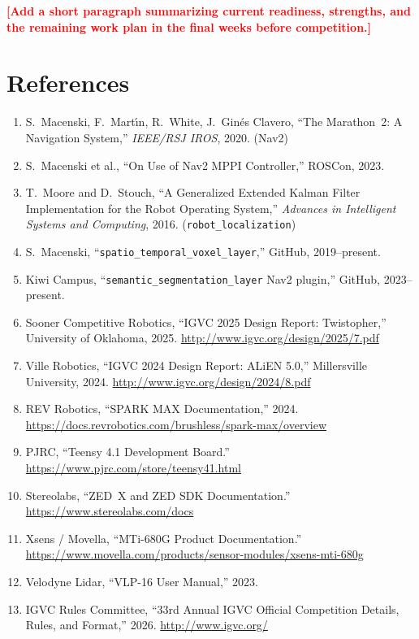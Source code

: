 \documentclass[11pt, letterpaper]{article}
\newcommand{\placeholder}[1]{\textcolor{red}{\textbf{[#1]}}}
\begin{document}
\placeholder{Add a short paragraph summarizing current readiness, strengths, and the
remaining work plan in the final weeks before competition.}

\section*{References}

\begin{enumerate}[leftmargin=*]
    \item S.~Macenski, F.~Mart{\'\i}n, R.~White, J.~Gin{\'e}s Clavero, ``The Marathon~2: A Navigation System,'' \textit{IEEE/RSJ IROS}, 2020. (Nav2)
    \item S.~Macenski et al., ``On Use of Nav2 MPPI Controller,'' ROSCon, 2023.
    \item T.~Moore and D.~Stouch, ``A Generalized Extended Kalman Filter Implementation for the Robot Operating System,'' \textit{Advances in Intelligent Systems and Computing}, 2016. (\texttt{robot\_localization})
    \item S.~Macenski, ``\texttt{spatio\_temporal\_voxel\_layer},'' GitHub, 2019--present.
    \item Kiwi Campus, ``\texttt{semantic\_segmentation\_layer} Nav2 plugin,'' GitHub, 2023--present.
    \item Sooner Competitive Robotics, ``IGVC 2025 Design Report: Twistopher,'' University of Oklahoma, 2025. \url{http://www.igvc.org/design/2025/7.pdf}
    \item Ville Robotics, ``IGVC 2024 Design Report: ALiEN 5.0,'' Millersville University, 2024. \url{http://www.igvc.org/design/2024/8.pdf}
    \item REV Robotics, ``SPARK MAX Documentation,'' 2024. \url{https://docs.revrobotics.com/brushless/spark-max/overview}
    \item PJRC, ``Teensy 4.1 Development Board.'' \url{https://www.pjrc.com/store/teensy41.html}
    \item Stereolabs, ``ZED~X and ZED SDK Documentation.'' \url{https://www.stereolabs.com/docs}
    \item Xsens / Movella, ``MTi-680G Product Documentation.'' \url{https://www.movella.com/products/sensor-modules/xsens-mti-680g}
    \item Velodyne Lidar, ``VLP-16 User Manual,'' 2023.
    \item IGVC Rules Committee, ``33rd Annual IGVC Official Competition Details, Rules, and Format,'' 2026. \url{http://www.igvc.org/}
\end{enumerate}
\end{document}
